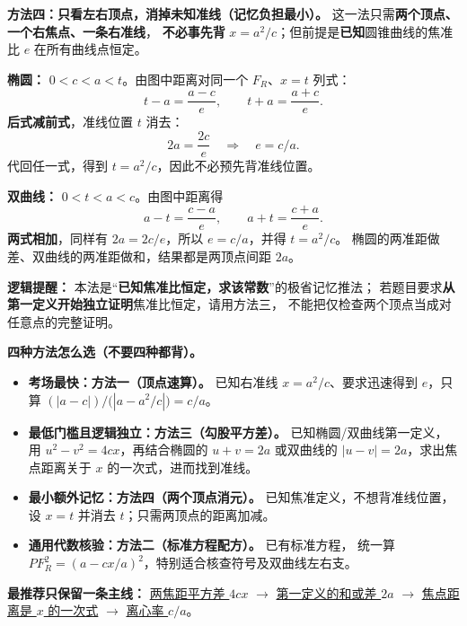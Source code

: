 \begin{proofbox}
\textbf{方法四：只看左右顶点，消掉未知准线（记忆负担最小）。}
这一法只需\textbf{两个顶点、一个右焦点、一条右准线}，
\textbf{不必事先背} $x=a^2/c$；但前提是\textbf{已知}圆锥曲线的焦准比 $e$ 在所有曲线点恒定。

\medskip

\textbf{椭圆：} $0<c<a<t$。由图中距离对同一个 $F_R$、$x=t$ 列式：
\[
 t-a=\frac{a-c}{e},\qquad t+a=\frac{a+c}{e}.
\]
\textbf{后式减前式}，准线位置 $t$ 消去：
\[
 2a=\frac{2c}{e}\quad\Longrightarrow\quad \boxed{e=c/a}.
\]
代回任一式，得到 $t=a^2/c$，因此不必预先背准线位置。

\medskip
\textbf{双曲线：} $0<t<a<c$。由图中距离得
\[
 a-t=\frac{c-a}{e},\qquad a+t=\frac{c+a}{e}.
\]
\textbf{两式相加}，同样有 $2a=2c/e$，所以 $\boxed{e=c/a}$，并得 $t=a^2/c$。
椭圆的两准距做差、双曲线的两准距做和，结果都是两顶点间距 $2a$。

\medskip
\textbf{逻辑提醒：} 本法是“\textbf{已知焦准比恒定，求该常数}”的极省记忆推法；
若题目要求\textbf{从第一定义开始独立证明}焦准比恒定，请用方法三，
不能把仅检查两个顶点当成对任意点的完整证明。
\end{proofbox}
\clearpage

\begin{proofbox}
\textbf{四种方法怎么选（不要四种都背）。}
\begin{itemize}
 \item \textbf{考场最快：方法一（顶点速算）。} 已知右准线 $x=a^2/c$、要求迅速得到 $e$，只算
 $\displaystyle (|a-c|)/\bigl(|a-a^2/c|\bigr)=c/a$。
 \item \textbf{最低门槛且逻辑独立：方法三（勾股平方差）。} 已知椭圆/双曲线第一定义，
 用 $u^2-v^2=4cx$，再结合椭圆的 $u+v=2a$ 或双曲线的 $|u-v|=2a$，求出焦点距离关于 $x$ 的一次式，进而找到准线。
 \item \textbf{最小额外记忆：方法四（两个顶点消元）。} 已知焦准定义，不想背准线位置，
 设 $x=t$ 并消去 $t$；只需两顶点的距离加减。
 \item \textbf{通用代数核验：方法二（标准方程配方）。} 已有标准方程，
 统一算 $PF_R^2=(a-cx/a)^2$，特别适合核查符号及双曲线左右支。
\end{itemize}
\textbf{最推荐只保留一条主线：} \underline{两焦距平方差 $4cx$}
 $\longrightarrow$ \underline{第一定义的和或差 $2a$}
 $\longrightarrow$ \underline{焦点距离是 $x$ 的一次式}
 $\longrightarrow$ \underline{离心率 $c/a$}。
\end{proofbox}
\clearpage

